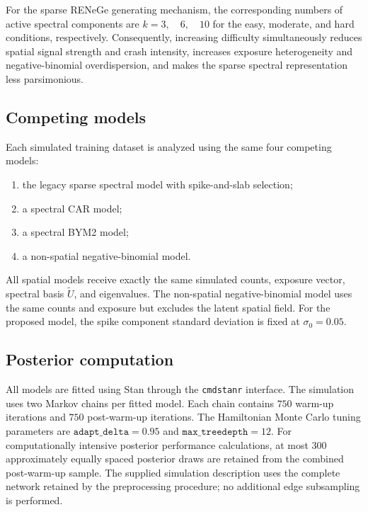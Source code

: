 \documentclass[11pt]{article}
\begin{document}
For the sparse RENeGe generating mechanism, the corresponding numbers of active spectral components are $k=3,\quad6,\quad10$ for the easy, moderate, and hard conditions, respectively. Consequently, increasing difficulty simultaneously reduces spatial signal strength and crash intensity, increases exposure heterogeneity and negative-binomial overdispersion, and makes the sparse spectral representation less parsimonious.

\subsection{Competing models}

Each simulated training dataset is analyzed using the same four competing models:

\begin{enumerate}
	\item the legacy sparse spectral model with spike-and-slab selection;
	\item a spectral CAR model;
	\item a spectral BYM2 model;
	\item a non-spatial negative-binomial model.
\end{enumerate}

All spatial models receive exactly the same simulated counts, exposure vector, spectral basis $\widetilde U$, and eigenvalues. The non-spatial negative-binomial model uses the same counts and exposure but excludes the latent spatial field. For the proposed model, the spike component standard deviation is fixed at $\sigma_0=0.05$.



\subsection{Posterior computation}

All models are fitted using Stan through the \texttt{cmdstanr} interface. The simulation uses two Markov chains per fitted model. Each chain contains $750$ warm-up iterations and $750$ post-warm-up iterations. The Hamiltonian Monte Carlo tuning parameters are $\texttt{adapt\_delta}=0.95$ and $\texttt{max\_treedepth}=12.$ For computationally intensive posterior performance calculations, at most 300 approximately equally spaced posterior draws are retained from the combined post-warm-up sample. The supplied simulation description uses the complete network retained by the preprocessing procedure; no additional edge subsampling is performed.
\end{document}

